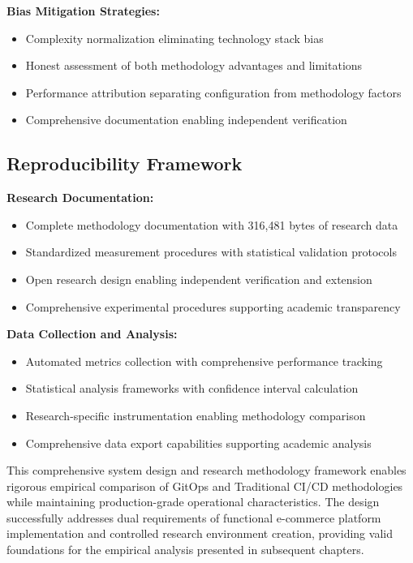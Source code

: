 \textbf{Bias Mitigation Strategies:}
\begin{itemize}
\item Complexity normalization eliminating technology stack bias
\item Honest assessment of both methodology advantages and limitations
\item Performance attribution separating configuration from methodology factors
\item Comprehensive documentation enabling independent verification
\end{itemize}

\subsection{Reproducibility Framework}

\textbf{Research Documentation:}
\begin{itemize}
\item Complete methodology documentation with 316,481 bytes of research data
\item Standardized measurement procedures with statistical validation protocols
\item Open research design enabling independent verification and extension
\item Comprehensive experimental procedures supporting academic transparency
\end{itemize}

\textbf{Data Collection and Analysis:}
\begin{itemize}
\item Automated metrics collection with comprehensive performance tracking
\item Statistical analysis frameworks with confidence interval calculation
\item Research-specific instrumentation enabling methodology comparison
\item Comprehensive data export capabilities supporting academic analysis
\end{itemize}

This comprehensive system design and research methodology framework enables rigorous empirical comparison of GitOps and Traditional CI/CD methodologies while maintaining production-grade operational characteristics. The design successfully addresses dual requirements of functional e-commerce platform implementation and controlled research environment creation, providing valid foundations for the empirical analysis presented in subsequent chapters.